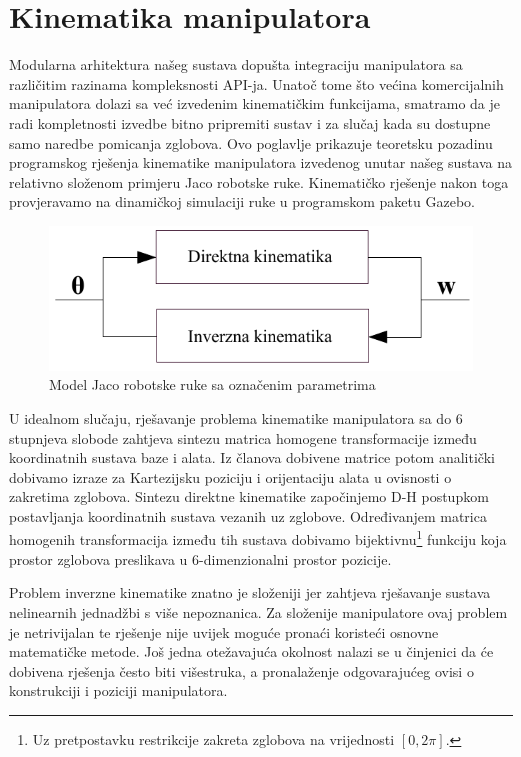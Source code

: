 \documentclass[times, utf8, diplomski, numeric]{fer}
\begin{document}
\chapter{Kinematika manipulatora}
Modularna arhitektura našeg sustava dopušta integraciju manipulatora sa različitim razinama kompleksnosti API-ja.
Unatoč tome što većina komercijalnih manipulatora dolazi sa već izvedenim kinematičkim funkcijama, smatramo da je radi kompletnosti izvedbe bitno pripremiti sustav i za slučaj kada su dostupne samo naredbe pomicanja zglobova.
Ovo poglavlje prikazuje teoretsku pozadinu programskog rješenja kinematike manipulatora izvedenog unutar našeg sustava na relativno složenom primjeru Jaco robotske ruke.
Kinematičko rješenje nakon toga provjeravamo na dinamičkoj simulaciji ruke u programskom paketu Gazebo.

\begin{figure}[h!]
\centering
\includegraphics[scale=0.8]{kinematika}
\caption{Model Jaco robotske ruke sa označenim parametrima} \label{h}
\end{figure}

U idealnom slučaju, rješavanje problema kinematike manipulatora sa do 6 stupnjeva slobode zahtjeva sintezu matrica homogene transformacije između koordinatnih sustava baze i alata.
Iz članova dobivene matrice potom analitički dobivamo izraze za Kartezijsku poziciju i orijentaciju alata u ovisnosti o zakretima zglobova.
Sintezu direktne kinematike započinjemo D-H postupkom postavljanja koordinatnih sustava vezanih uz zglobove.
Određivanjem matrica homogenih transformacija između tih sustava dobivamo bijektivnu\footnote{Uz pretpostavku restrikcije zakreta zglobova na vrijednosti $[0,2\pi]$.} funkciju koja prostor zglobova preslikava u 6-dimenzionalni prostor pozicije.

Problem inverzne kinematike znatno je složeniji jer zahtjeva rješavanje sustava nelinearnih jednadžbi s više nepoznanica.
Za složenije manipulatore ovaj problem je netrivijalan te rješenje nije uvijek moguće pronaći koristeći osnovne matematičke metode.
Još jedna otežavajuća okolnost nalazi se u činjenici da će dobivena rješenja često biti višestruka, a pronalaženje odgovarajućeg ovisi o konstrukciji i poziciji manipulatora.
\end{document}
